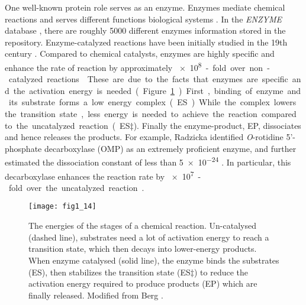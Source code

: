 \begin{refsection}
One well-known protein role serves as an enzyme. Enzymes mediate chemical
reactions and serves different functions biological
systems \cite{AthelCornish-Bowden2012,Stryer1995,Radzicka1995a}. In the
\emph{ENZYME} database \cite{Schomburg2004}, there are roughly 5000 different
enzymes information stored in the repository.  Enzyme-catalyzed reactions have
been initially studied in the 19th century \cite{AthelCornish-Bowden2012}.
Compared to chemical catalysts, enzymes are highly specific and enhance the
rate of reaction by approximately \SI{e8}-fold over non-catalyzed reactions
\cite{Stryer1995}. These are due to the facts that enzymes are specific and the
activation energy is needed (Figure \ref{fig:enzyme-intro}). First, binding
of enzyme and its substrate forms a low energy complex (ES).  While the complex
lowers the transition state, less energy is needed to achieve the reaction
compared to the uncatalyzed reaction (ES$\ddag$).  Finally the enzyme-product, EP,
dissociates and hence releases the products. For example, Radzicka 
identified \emph{O}-rotidine 5\rq-phosphate decarboxylase (OMP) as an extremely
proficient enzyme, and further estimated the dissociation constant of less than
\SI{5e-24}{\Molar} \cite{Radzicka1995a}. In particular, this decarboxylase
enhances the reaction rate by \SI{e7}-fold over the uncatalyzed
reaction \cite{Radzicka1995a}. 
\begin{figure}[htbp] 
    \centering \texttt{[image: fig1\_14]}
    \caption[The energies of the stages of a chemical reaction. Uncatalysed
    (dashed line), substrates need a lot of activation energy to reach a
transition state, which then decays into lower-energy products. When enzyme
catalysed (solid line), the enzyme binds the substrates (ES), then stabilizes
the transition state (ES$\ddag$) to reduce the activation energy required to produce
products (EP) which are finally released.]{The energies of the stages of a
    chemical reaction. Un-catalysed (dashed line), substrates need a lot of
    activation energy to reach a transition state, which then decays into
    lower-energy products. When enzyme catalysed (solid line), the enzyme binds
    the substrates (ES), then stabilizes the transition state (ES$\ddag$) to reduce
    the activation energy required to produce products (EP) which are finally
    released. Modified from Berg  \cite{Berg2002}.} 
    \label{fig:enzyme-intro}
\end{figure}


\end{refsection}
